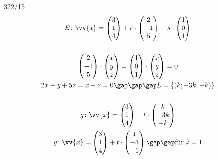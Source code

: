 \begin{exercise}{322/15}
  \begin{gather*}
    E \colon \vv{x} = \begin{pmatrix}3 \\ 1 \\ 4\end{pmatrix} + r \cdot \begin{pmatrix}2 \\ -1 \\ 5\end{pmatrix} + s \cdot \begin{pmatrix}1 \\ 0 \\ 1\end{pmatrix} \\\\
    \begin{pmatrix}2 \\ -1 \\ 5\end{pmatrix} \cdot \begin{pmatrix}x \\ y \\ z\end{pmatrix} = \begin{pmatrix}1 \\ 0 \\ 1\end{pmatrix} \cdot \begin{pmatrix}x \\ y \\ z\end{pmatrix} = 0 \\
    2x - y + 5z = x + z = 0 \gap\gap\gap L = \{(k;-3k;-k)\} \\\\
    g \colon \vv{x} = \begin{pmatrix}3 \\ 1 \\ 4\end{pmatrix} + t \cdot \begin{pmatrix}k \\ -3k \\ -k\end{pmatrix} \\
    g \colon \vv{x} = \begin{pmatrix}3 \\ 1 \\ 4\end{pmatrix} + t \cdot \begin{pmatrix}1 \\ -3 \\ -1\end{pmatrix} \gap\gap \text{für $k = 1$}
  \end{gather*}
\end{exercise}
